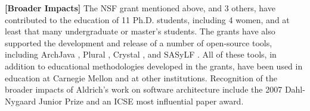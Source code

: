 \documentclass[11pt,letterpaper]{article}
\begin{document}
\textbf{[Broader Impacts]} The NSF grant mentioned above, and 3 others, have contributed to the education of 11 Ph.D. students, including 4 women, and at least that many undergraduate or master's students.  The grants have also supported the development and release of a number of open-source tools,
including ArchJava \cite{ArchJava}, Plural \cite{pluraltool}, Crystal \cite{Crystal}, and SASyLF
\cite{SASyLF}. All of these tools, in addition to educational methodologies developed in the grants, have been used in education at
Carnegie Mellon and at other institutions.  Recognition of the broader impacts of
Aldrich's work on software architecture include the 2007 Dahl-Nygaard
Junior Prize and an ICSE most influential paper award.

\end{document}
